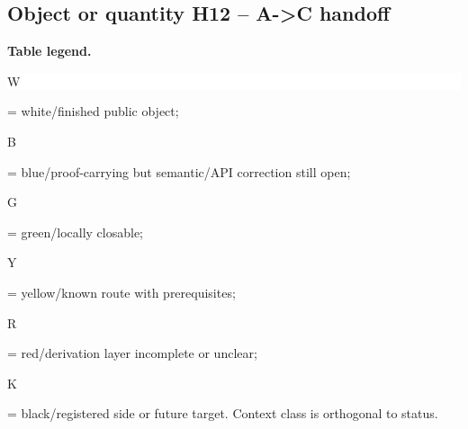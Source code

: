 \subsection*{Object or quantity H12 -- A->C handoff}
\hypertarget{objproof:H12}{}
\par\smallskip\noindent\begin{minipage}{0.99\linewidth}\footnotesize\raggedright\textbf{Table legend.} \colorbox{white}{\strut W} = white/finished public object; \colorbox{cyan!20}{\strut B} = blue/proof-carrying but semantic/API correction still open; \colorbox{green!18}{\strut G} = green/locally closable; \colorbox{yellow!25}{\strut Y} = yellow/known route with prerequisites; \colorbox{red!20}{\strut R} = red/derivation layer incomplete or unclear; \colorbox{black!18}{\strut K} = black/registered side or future target. Context class is orthogonal to status.\end{minipage}\par\vspace{0.25em}

